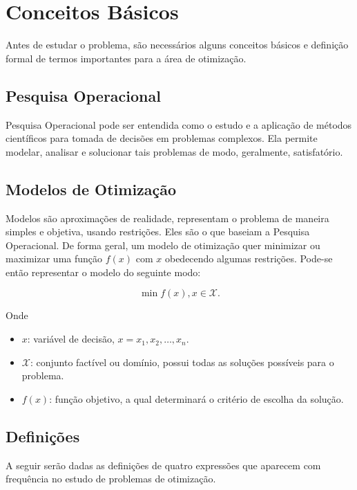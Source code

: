 \chapter{Conceitos Básicos}\label{ch:conceitos-basicos}

Antes de estudar o problema, são necessários alguns conceitos básicos e definição formal de termos importantes para a área de otimização.


\section{Pesquisa Operacional}\label{sec:pesquisa-operacional}

Pesquisa Operacional pode ser entendida como o estudo e a aplicação de métodos científicos para tomada de decisões em problemas complexos\cite[p.IX]{arenales}.
Ela permite modelar, analisar e solucionar tais problemas de modo, geralmente, satisfatório.


\section{Modelos de Otimização}\label{sec:modelos-de-otimizacao}

Modelos são aproximações de realidade, representam o problema de maneira simples e objetiva, usando restrições.
Eles são o que baseiam a Pesquisa Operacional.
De forma geral, um modelo de otimização quer minimizar ou maximizar uma função $f(x)$ com $x$ obedecendo algumas restrições.
Pode-se então representar o modelo do seguinte modo:

\[
    \min f(x), x \in \mathcal{X}.
\]

Onde

\begin{itemize}
    \item $x$: variável de decisão, $x = x_1, x_2, \dots, x_n$.
    \item $\mathcal{X}$: conjunto factível ou domínio, possui todas as soluções possíveis para o problema.
    \item $f(x)$: função objetivo, a qual determinará o critério de escolha da solução.
\end{itemize}


\section{Definições}\label{sec:definicoes}

A seguir serão dadas as definições de quatro expressões que aparecem com frequência no estudo de problemas de otimização.

